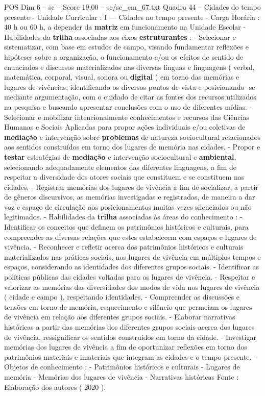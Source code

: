 \begin{textsample}{POS Dim 6 – sc – Score 19.00 – sc/sc\_em\_67.txt}
Quadro 44 – Cidades do tempo presente - Unidade Curricular : I — Cidades no tempo presente - Carga Horária : 40 h ou 60 h, a depender da \textbf{matriz} em funcionamento na Unidade Escolar - Habilidades da \textbf{trilha} associadas aos eixos \textbf{estruturantes} : - Selecionar e sistematizar, com base em estudos de campo, visando fundamentar reflexões e hipóteses sobre a organização, o funcionamento e/ou os efeitos de sentido de enunciados e discursos materializados nas diversas línguas e linguagens ( verbal, matemática, corporal, visual, sonora ou \textbf{digital} ) em torno das memórias e lugares de vivências, identificando os diversos pontos de vista e posicionando -se mediante argumentação, com o cuidado de citar as fontes dos recursos utilizados na pesquisa e buscando apresentar conclusões com o uso de diferentes mídias. - Selecionar e mobilizar intencionalmente conhecimentos e recursos das Ciências Humanas e Sociais Aplicadas para propor ações individuais e/ou coletivas de \textbf{mediação} e intervenção sobre \textbf{problemas} de natureza sociocultural relacionados aos sentidos construídos em torno dos lugares de memória nas cidades. - Propor e \textbf{testar} estratégias de \textbf{mediação} e intervenção sociocultural e \textbf{ambiental}, selecionando adequadamente elementos das diferentes linguagens, a fim de respeitar a diversidade dos atores sociais que constituem e se constituem nas cidades. - Registrar memórias dos lugares de vivência a fim de socializar, a partir de gêneros discursivos, as memórias investigadas e registradas, de maneira a dar voz e espaço de circulação aos posicionamentos muitas vezes silenciados ou não legitimados. - Habilidades da \textbf{trilha} associadas às áreas do conhecimento : - Identificar os conceitos que definem os patrimônios históricos e culturais, para compreender as diversas relações que estes estabelecem com espaços e lugares de vivência. - Reconhecer e refletir acerca dos patrimônios históricos e culturais materializados nas práticas sociais, nos lugares de vivência em múltiplos tempos e espaços, considerando as identidades dos diferentes grupos sociais. - Identificar as políticas públicas das cidades voltadas para os lugares de vivência. - Respeitar e valorizar as memórias das diversidades dos modos de vida nos lugares de vivência ( cidade e campo ), respeitando identidades. - Compreender as discussões e tensões em torno de memória, esquecimento e silêncio que permeiam os lugares de vivência em relação aos diferentes grupos sociais. - Elaborar narrativas históricas a partir das memórias dos diferentes grupos sociais acerca dos lugares de vivência, ressignificar os sentidos construídos em torno da cidade. - Investigar memórias dos lugares de vivência a fim de oportunizar reflexões em torno dos patrimônios materiais e imateriais que integram as cidades e o tempo presente. - Objetos de conhecimento : - Patrimônios históricos e culturais - Lugares de memória - Memórias dos lugares de vivência - Narrativas históricas Fonte : Elaboração dos autores ( 2020 ).

\end{textsample}
